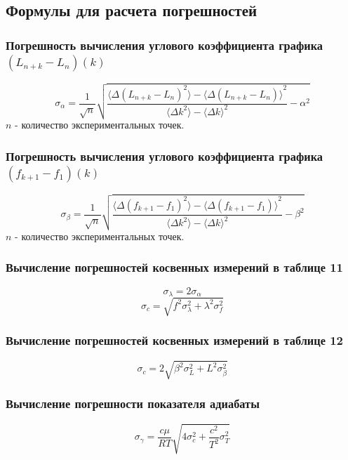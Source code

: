 \subsection{Формулы для расчета погрешностей} \label{Приложение 7}
\subsubsection{Погрешность вычисления углового коэффициента графика $(L_{n+k} - L_n)(k)$}
\[\sigma_\alpha = \frac{1}{\sqrt{n}}\sqrt{\frac{\langle \Delta (L_{n+k} - L_n)^2 \rangle - {\langle \Delta (L_{n+k} - L_n) \rangle}^2}{\langle \Delta k^2 \rangle - {\langle \Delta k \rangle}^2} - \alpha^2}\] $n$ - количество экспериментальных точек.

\subsubsection{Погрешность вычисления углового коэффициента графика $(f_{k+1} - f_1)(k)$}
\[\sigma_\beta = \frac{1}{\sqrt{n}}\sqrt{\frac{\langle \Delta (f_{k+1} - f_1)^2 \rangle - {\langle \Delta (f_{k+1} - f_1) \rangle}^2}{\langle \Delta k^2 \rangle - {\langle \Delta k \rangle}^2} - \beta^2}\] $n$ - количество экспериментальных точек.

\subsubsection{Вычисление погрешностей косвенных измерений в таблице 11}
\[\sigma_\lambda = 2\sigma_\alpha\]
\[\sigma_c = \sqrt{f^2\sigma_\lambda^2 + \lambda^2\sigma_f^2}\]

\subsubsection{Вычисление погрешностей косвенных измерений в таблице 12}
\[\sigma_c = 2\sqrt{\beta^2\sigma_L^2 + L^2\sigma_\beta^2}\]

\subsubsection{Вычисление погрешности показателя адиабаты}
\[ \sigma_\gamma = \frac{c\mu}{RT}\sqrt{4\sigma_c^2 + \frac{c^2}{T^2}\sigma_T^2}\]

